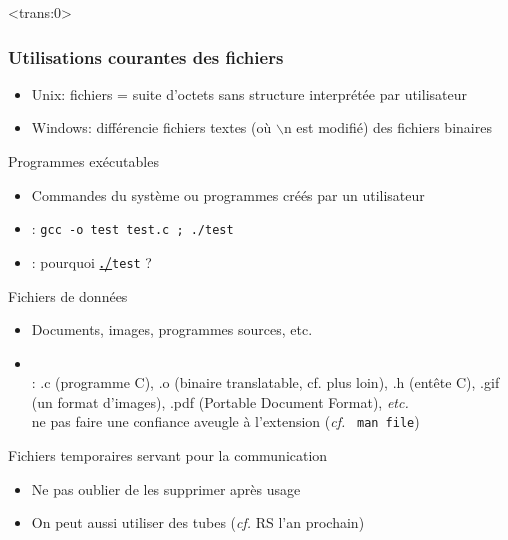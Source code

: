 \begin{frame}<trans:0>\frametitle{Utilisations courantes des fichiers}

  \begin{itemize}
  \item Unix: fichiers = suite d'octets sans structure interprétée par
    utilisateur
  \item Windows: différencie fichiers textes (où $\backslash$n est modifié)
    des fichiers binaires
  \end{itemize}

  \begin{block}{Programmes exécutables}
    \begin{itemize}
    \item Commandes du système ou programmes créés par un utilisateur
    \item {}: \texttt{gcc -o test test.c ; ./test} \\
    \item {}: pourquoi
      \underline{\textbf{./}}\texttt{test} ?
    \end{itemize}
  \end{block}\vspace{-\baselineskip}

  \begin{block}{Fichiers de données}
    \begin{itemize}
    \item Documents, images, programmes sources, etc.
    \item {} \\
       : .c (programme C), .o (binaire translatable,
      cf. plus loin), .h (entête C), .gif (un format d'images), .pdf
      (Portable Document Format), \textit{etc.}\\
       ne pas faire une confiance aveugle à
      l'extension (\textit{cf.}~ \texttt{man file})
    \end{itemize}
  \end{block}\vspace{-\baselineskip}
  
  \begin{block}{Fichiers temporaires servant pour la communication}
    \begin{itemize}
    \item Ne pas oublier de les supprimer après usage
    \item On peut aussi utiliser des tubes (\textit{cf.} RS l'an prochain)
    \end{itemize}
  \end{block}
\end{frame}
